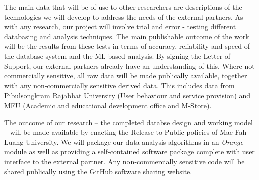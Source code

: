 \documentclass[11pt]{article}
\begin{document}
\vspace{2mm}
\noindent
The main data that will be of use to other researchers are descriptions of the technologies we will develop to address the needs of the external partners. As with any research, our project will involve trial and error - testing different databasing and analysis techniques. The main publishable outcome of the work will be the results from these tests in terms of accuracy, reliability and speed of the database system and the ML-based analysis. By signing the Letter of Support, our external partners already have an understanding of this. Where not commercially sensitive, all raw data will be made publically available, together with any non-commercially sensitive derived data. This includes data from Pibulsongkram Rajabhat University (User behaviour and service provision) and MFU (Academic and educational development office and M-Store).

\vspace{2mm}
\noindent
 The outcome of our research  -- the completed databse design and working model -- will be made available by enacting the Release to Public policies of Mae Fah Luang University. We will package our data analysis algorithms in an {\it Orange} module as well as providing a self-contained software package complete with user interface to the external partner. Any non-commercially sensitive code will be shared publically using the GitHub software sharing website.




\end{document}
